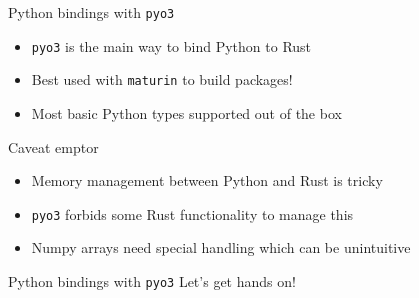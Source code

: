 \documentclass{beamer}
\begin{document}
\begin{frame}{Python bindings with \texttt{pyo3}}
  \begin{itemize}
    \item \texttt{pyo3} is the main way to bind Python to Rust
    \item Best used with \texttt{maturin} to build packages!
    \item Most basic Python types supported out of the box
  \end{itemize}
\end{frame}

\begin{frame}{Caveat emptor}
  \begin{itemize}
    \item Memory management between Python and Rust is tricky
    \item \texttt{pyo3} forbids some Rust functionality to manage this
    \item Numpy arrays need special handling which can be unintuitive
  \end{itemize}
\end{frame}

\begin{frame}{Python bindings with \texttt{pyo3}}
  Let's get hands on!
\end{frame}
\end{document}
